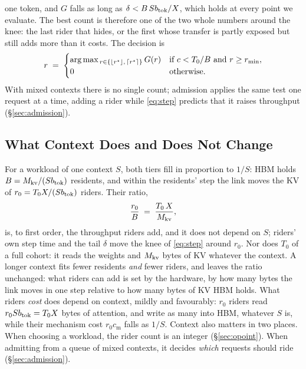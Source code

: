 one token, and $G$ falls as long as $\delta < B\,Sb_{\mathrm{tok}}/X$, which holds
at every point we evaluate. The best count is therefore one of the two whole
numbers around the knee: the last rider that hides, or the first whose
transfer is partly exposed but still adds more than it costs. The decision is
\begin{equation}
  r \;=\;
  \begin{cases}
    \arg\max_{\,r \in \{\lfloor r^{\star}\rfloor,\, \lceil r^{\star}\rceil\}} G(r)
      & \text{if } c < T_0/B \text{ and } r \ge r_{\min},\\
    0 & \text{otherwise.}
  \end{cases}
  \label{eq:decision}
\end{equation}
With mixed contexts there is no single count; admission applies the same test
one request at a time, adding a rider while \cref{eq:step} predicts that it
raises throughput (\S\ref{sec:admission}).

\subsection{What Context Does and Does Not Change}\label{sec:context}

For a workload of one context $S$, both tiers fill in proportion to $1/S$: HBM
holds $B = M_{\mathrm{kv}}/(Sb_{\mathrm{tok}})$ residents, and within the residents' step the link
moves the KV of $r_0 = T_0X/(Sb_{\mathrm{tok}})$ riders. Their ratio,
\begin{equation}
  \frac{r_0}{B} \;=\; \frac{T_0\,X}{M_{\mathrm{kv}}},
  \label{eq:ratio}
\end{equation}
is, to first order, the throughput riders add, and it does not depend on $S$;
riders' own step time and the tail $\delta$ move the knee of \cref{eq:step}
around $r_0$. Nor does $T_0$ of a
full cohort: it reads the weights and $M_{\mathrm{kv}}$ bytes of KV whatever the context.
A longer context
fits fewer residents \emph{and} fewer riders, and leaves the ratio unchanged:
what riders can add is set by the hardware, by how many bytes the link moves
in one step relative to how many bytes of KV HBM holds. What riders \emph{cost}
does depend on context, mildly and favourably: $r_0$ riders read
$r_0 Sb_{\mathrm{tok}} = T_0X$ bytes of attention, and write as many into HBM,
whatever $S$ is, while their mechanism cost $r_0 c_{\mathrm{m}}$ falls as
$1/S$. Context also matters
in two places. When choosing a workload, the rider count is an integer
(\S\ref{sec:opoint}). When admitting from a queue of mixed contexts, it decides
\emph{which} requests should ride (\S\ref{sec:admission}).

